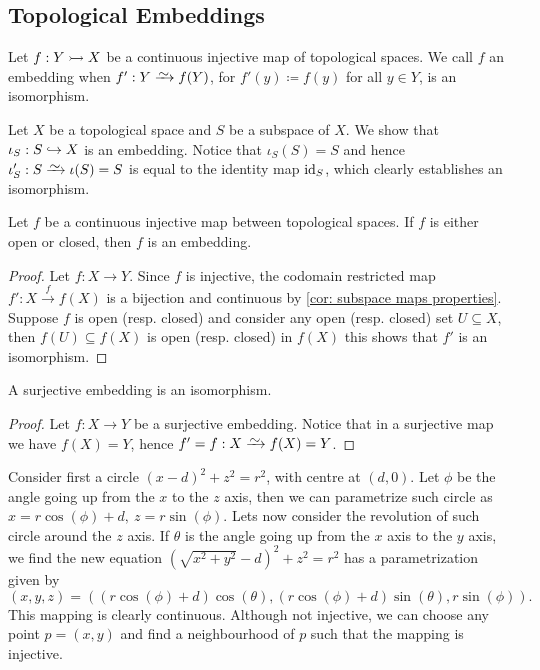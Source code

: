 \subsection{Topological Embeddings}

\begin{definition}[Embedding]\label{def: topological embedding}
Let \(f: Y \rightarrowtail X\) be a continuous injective map of topological spaces. We
call \(f\) an embedding when \(f': Y \isoto f(Y)\), for \(f'(y) \coloneq f(y)\)
for all \(y \in Y\), is an isomorphism.
\end{definition}

\begin{example}
Let \(X\) be a topological space and \(S\) be a subspace of \(X\). We show
that \(\iota_S: S \hookrightarrow X\) is an embedding. Notice that
\(\iota_S(S) = S\) and hence \(\iota_S': S \isoto \iota(S) = S\) is equal to
the identity map \(\operatorname{id}_S\), which clearly establishes an isomorphism.
\end{example}

\begin{proposition}
Let \(f\) be a continuous injective map between topological spaces. If \(f\)
is either open or closed, then \(f\) is an embedding.
\end{proposition}

\begin{proof}
Let \(f: X \to Y\). Since \(f\) is injective, the codomain restricted map
\(f': X \xrightarrow f f(X)\) is a bijection and continuous by \cref{cor:
subspace maps properties}. Suppose \(f\) is open (resp. closed) and consider
any open (resp. closed) set \(U \subseteq X\), then \(f(U) \subseteq f(X)\) is
open (resp. closed) in \(f(X)\) this shows that \(f'\) is an isomorphism.
\end{proof}

\begin{proposition}
A surjective embedding is an isomorphism.
\end{proposition}

\begin{proof}
Let \(f: X \to Y\) be a surjective embedding. Notice that in a surjective map
we have \(f(X) = Y\), hence \(f' = f : X \isoto f(X) = Y\).
\end{proof}

\begin{example}
Consider first a circle \((x - d)^2 + z^2 = r^2\), with centre at \((d, 0)\).
Let \(\phi\) be the angle going up from the \(x\) to the \(z\) axis, then we
can parametrize such circle as \(x = r \cos(\phi) + d,\ z = r\sin(\phi)\).
Lets now consider the revolution of such circle around the \(z\) axis. If
\(\theta\) is the angle going up from the \(x\) axis to the \(y\) axis, we
find the new equation \((\sqrt{x^2 + y^2} - d)^2 + z^2 = r^2\) has a
parametrization given by
\[
  (x, y, z) = ((r \cos(\phi) + d)\cos(\theta), (r\cos(\phi) + d)\sin(\theta),
  r\sin(\phi)).
\]
This mapping is clearly continuous. Although not injective, we can choose any
point \(p = (x, y)\) and find a neighbourhood of \(p\) such that the mapping
is injective.
\end{example}

